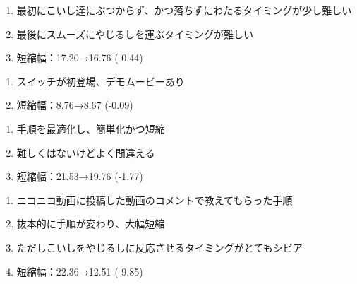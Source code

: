 \begin{enumerate}[label={\sarrow}]
\item 最初にこいし達にぶつからず、かつ落ちずにわたるタイミングが少し難しい
\item 最後にスムーズにやじるしを運ぶタイミングが難しい
\item 短縮幅：17.20→16.76 (-0.44)
\end{enumerate}



\clearpage
\begin{enumerate}[label={\sarrow}]
\item スイッチが初登場、デモムービーあり
\item 短縮幅：8.76→8.67 (-0.09)
\end{enumerate}



\begin{enumerate}[label={\sarrow}]
\item 手順を最適化し、簡単化かつ短縮
\item 難しくはないけどよく間違える
\item 短縮幅：21.53→19.76 (-1.77)
\end{enumerate}



\begin{enumerate}[label={\sarrow}]
\item ニコニコ動画に投稿した動画のコメントで教えてもらった手順
\item 抜本的に手順が変わり、大幅短縮
\item ただしこいしをやじるしに反応させるタイミングがとてもシビア
\item 短縮幅：22.36→12.51 (-9.85)
\end{enumerate}



